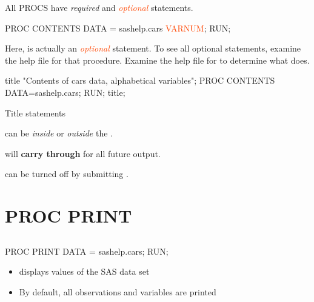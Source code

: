 \begin{frame}[fragile]
All PROCS have \emph{required} and \textcolor{OrangeRed}{\emph{optional}} statements.
\vskip10pt
\footnotesize
\begin{code}{.0}
PROC CONTENTS DATA = sashelp.cars \textcolor{OrangeRed}{VARNUM};
RUN;
\end{code}
\emp
\vskip20pt
Here, \textcolor{OrangeRed}{} is actually an \textcolor{OrangeRed}{\emph{optional}} statement.  To see all optional statements, examine the help file for that procedure.
\vskip20pt
\oyo Examine the help file for  to determine what \textcolor{OrangeRed}{} does.
\end{frame}

\begin{frame}[fragile]
\begin{code}{.0}
title "Contents of cars data, alphabetical variables";
PROC CONTENTS DATA=sashelp.cars;
RUN;
title;
\end{code}
\vskip10pt
Title statements
\bi
\item can be \emph{inside} or \emph{outside} the .
\item will \textbf{carry through} for all future output.
\item can be turned off by submitting .
\ei
\end{frame}

\section[PROC PRINT]{PROC PRINT}
\subsection{}
\begin{frame}
\end{frame}

\begin{frame}[fragile]
\footnotesize
\begin{code}{.0}
PROC PRINT DATA = sashelp.cars;
RUN;
\end{code}
\emp
\vskip10pt
\begin{itemize}
    \item {} displays values of the SAS data set
    \item By default, all observations and variables are printed
\end{itemize}
\end{frame}

